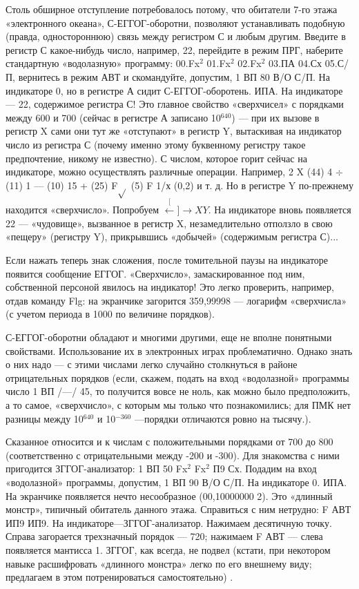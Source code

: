 \documentclass[11pt,a4paper,oneside]{article}
\def\XY{$\stackrel[\leftarrow]{\rightarrow}{XY}$}
\begin{document}
Столь обширное отступление потребовалось потому, что обитатели 7-го этажа «электронного океана», С-ЕГГОГ-оборотни, позволяют устанавливать подобную (правда, одностороннюю) связь между регистром С и любым другим. Введите в регистр С какое-нибудь число, например, 22, перейдите в режим ПРГ, наберите стандартную «водолазную» программу: 00.Fx$^{2}$ 01.Fx$^{2}$ 02.Fx$^{2}$ 03.ПА 04.Сх 05.С/П, вернитесь в режим АВТ и скомандуйте, допустим, 1 ВП 80 В/О С/П. На индикаторе 0, но в регистре А сидит С-ЕГГОГ-оборотень. ИПА. На индикаторе — 22, содержимое регистра С! Это главное свойство «сверхчисел» с порядками между 600 и 700 (сейчас в регистре А записано 10$^{640}$) — при их вызове в регистр X сами они тут же «отступают» в регистр Y, вытаскивая на индикатор число из регистра С (почему именно этому буквенному регистру такое предпочтение, никому не известно). С числом, которое горит сейчас на индикаторе, можно осуществлять различные операции. Например, 2 X (44) 4 $\div$ (11) 1 — (10) 15 + (25) F$\sqrt{}$ (5) F 1/х (0,2) и т. д. Но в регистре Y по-прежнему находится «сверхчисло». Попробуем \XY. На индикаторе вновь появляется 22 — «чудовище», вызванное в регистр X, незамедлительно отползло в свою «пещеру» (регистру Y), прикрывшись «добычей» (содержимым регистра С)...

Если нажать теперь знак сложения, после томительной паузы на индикаторе появится сообщение ЕГГОГ. «Сверхчисло», замаскированное под ним, собственной персоной явилось на индикатор! Это легко проверить, например, отдав команду Flg: на экранчике загорится 359,99998 — логарифм «сверхчисла» (с учетом периода в 1000 по величине порядков).

С-ЕГГОГ-оборотни обладают и многими другими, еще не вполне понятными свойствами. Использование их в электронных играх проблематично. Однако знать о них надо — с этими числами легко случайно столкнуться в районе отрицательных порядков (если, скажем, подать на вход «водолазной» программы число 1 ВП /—/ 45, то получится вовсе не ноль, как можно было предположить, а то самое, «сверхчисло», с которым мы только что познакомились; для ПМК нет разницы между 10$^{640}$ и 10$^{-360}$ —порядки отличаются ровно на тысячу.).

Сказанное относится и к числам с положительными порядками от 700 до 800 (соответственно с отрицательными между -200 и -300). Для знакомства с ними пригодится ЗГГОГ-анализатор: 1 ВП 50 Fx$^{2}$ Fx$^{2}$ П9 Сх. Подадим на вход «водолазной» программы, допустим, 1 ВП 90 В/О С/П. На индикаторе 0. ИПА. На экранчике появляется нечто несообразное (00,10000000 2). Это «длинный монстр», типичный обитатель данного этажа. Справиться с ним нетрудно: F АВТ ИП9 ИП9. На индикаторе—ЗГГОГ-анализатор. Нажимаем десятичную точку. Справа загорается трехзначный порядок — 720; нажимаем F АВТ — слева появляется мантисса 1. ЗГГОГ, как всегда, не подвел (кстати, при некотором навыке расшифровать «длинного монстра» легко по его внешнему виду; предлагаем в этом потренироваться самостоятельно) .
\end{document}

